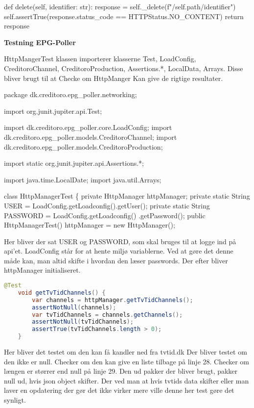 \begin{code}[language=python, caption=BestCaseTest.py, firstnumber=80]
def delete(self, identifier: str):
    response = self._delete(f"/{self.path}/{identifier}")
    self.assertTrue(response.status_code == HTTPStatus.NO_CONTENT)
    return response
\end{code}


\newpage
{\large\textbf{Testning EPG-Poller}}

HttpMangerTest klassen importerer klasserne Test, LoadConfig, CreditoroChannel, CreditoroProduction, Assertions.*, LocalData, Arrays.
Disse bliver brugt til at Checke om HttpManger Kan give de rigtige resultater.

\begin{code}[language=java, caption=HttpManagerTest.java, firstnumber=1]
package dk.creditoro.epg_poller.networking;

import org.junit.jupiter.api.Test;

import dk.creditoro.epg_poller.core.LoadConfig;
import dk.creditoro.epg_poller.models.CreditoroChannel;
import dk.creditoro.epg_poller.models.CreditoroProduction;

import static org.junit.jupiter.api.Assertions.*;

import java.time.LocalDate;
import java.util.Arrays;

class HttpManagerTest \{
    private HttpManager httpManager;
    private static String USER = LoadConfig.getLoadconfig().getUser();
    private static String PASSWORD = LoadConfig.getLoadconfig()
        .getPassword();
    public HttpManagerTest() {
        httpManager = new HttpManager();
    }
\end{code}

Her bliver der sat USER og PASSWORD, som skal bruges til at logge ind på api'et. LoadConfig står for at hente miljø variablerne.
Ved at gøre det denne måde kan, man altid skifte i hvordan den læser passwords.
Der efter bliver httpManager initialiseret.


\begin{lstlisting}[language=java, caption=HttpManagerTest.java, firstnumber=23]
    @Test
    void getTvTidChannels() {
        var channels = httpManager.getTvTidChannels();
        assertNotNull(channels);
        var tvTidChannels = channels.getChannels();
        assertNotNull(tvTidChannels);
        assertTrue(tvTidChannels.length > 0);
    }
\end{lstlisting}
Her bliver det testet om den kan få kandler ned fra tvtid.dk
Der bliver testet om den ikke er null. 
Checker om den kan give en liste tilbage på linje 28.
Checker om længen er størrer end null på linje 29.
Den ud pakker der bliver brugt, pakker null ud, hvis json object skifter. 
Der ved man at hvis tvtids data skifter eller man laver en opdatering der gør det ikke virker mere ville denne her test gøre det synligt.


